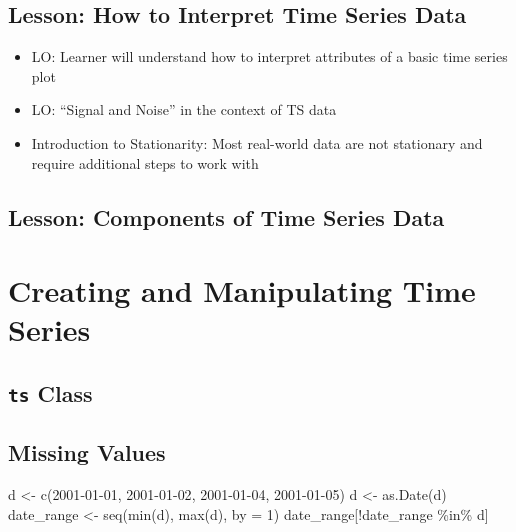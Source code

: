 \documentclass[
]{book}
\newenvironment{Shaded}{\begin{snugshade}}{\end{snugshade}}
\newcommand{\AttributeTok}[1]{\textcolor[rgb]{0.77,0.63,0.00}{#1}}
\newcommand{\DecValTok}[1]{\textcolor[rgb]{0.00,0.00,0.81}{#1}}
\newcommand{\FunctionTok}[1]{\textcolor[rgb]{0.00,0.00,0.00}{#1}}
\newcommand{\NormalTok}[1]{#1}
\newcommand{\OtherTok}[1]{\textcolor[rgb]{0.56,0.35,0.01}{#1}}
\newcommand{\SpecialCharTok}[1]{\textcolor[rgb]{0.00,0.00,0.00}{#1}}
\newcommand{\StringTok}[1]{\textcolor[rgb]{0.31,0.60,0.02}{#1}}
\providecommand{\tightlist}{%
  \setlength{\itemsep}{0pt}\setlength{\parskip}{0pt}}
\begin{document}
\hypertarget{lesson-how-to-interpret-time-series-data}{%
\section{Lesson: How to Interpret Time Series Data}\label{lesson-how-to-interpret-time-series-data}}

\begin{itemize}
\tightlist
\item
  LO: Learner will understand how to interpret attributes of a basic time series plot
\item
  LO: ``Signal and Noise'' in the context of TS data
\item
  Introduction to Stationarity: Most real-world data are not stationary and require additional steps to work with
\end{itemize}

\hypertarget{lesson-components-of-time-series-data}{%
\section{Lesson: Components of Time Series Data}\label{lesson-components-of-time-series-data}}

\hypertarget{creating-and-manipulating-time-series}{%
\chapter{Creating and Manipulating Time Series}\label{creating-and-manipulating-time-series}}

\hypertarget{ts-class}{%
\section{\texorpdfstring{\texttt{ts} Class}{ts Class}}\label{ts-class}}

\hypertarget{missing-values}{%
\section{Missing Values}\label{missing-values}}

\begin{Shaded}
\begin{Highlighting}[]
\NormalTok{d }\OtherTok{\textless{}{-}} \FunctionTok{c}\NormalTok{(}\StringTok{\textquotesingle{}2001{-}01{-}01\textquotesingle{}}\NormalTok{, }\StringTok{\textquotesingle{}2001{-}01{-}02\textquotesingle{}}\NormalTok{, }\StringTok{\textquotesingle{}2001{-}01{-}04\textquotesingle{}}\NormalTok{, }\StringTok{\textquotesingle{}2001{-}01{-}05\textquotesingle{}}\NormalTok{)}
\NormalTok{d }\OtherTok{\textless{}{-}} \FunctionTok{as.Date}\NormalTok{(d)}
\NormalTok{date\_range }\OtherTok{\textless{}{-}} \FunctionTok{seq}\NormalTok{(}\FunctionTok{min}\NormalTok{(d), }\FunctionTok{max}\NormalTok{(d), }\AttributeTok{by =} \DecValTok{1}\NormalTok{) }
\NormalTok{date\_range[}\SpecialCharTok{!}\NormalTok{date\_range }\SpecialCharTok{\%in\%}\NormalTok{ d] }
\end{Highlighting}
\end{Shaded}
\end{document}
